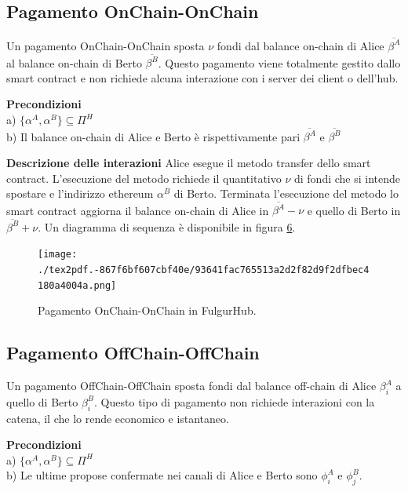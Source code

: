 \documentclass[12pt,italian,]{book}
\begin{document}
\hypertarget{pagamento-onchain-onchain}{%
\subsection{Pagamento OnChain-OnChain}\label{pagamento-onchain-onchain}}

Un pagamento OnChain-OnChain sposta \(\nu\) fondi dal balance on-chain di Alice \(\overline{\beta^A}\) al balance on-chain di Berto \(\overline{\beta^B}\). Questo pagamento viene totalmente gestito dallo smart contract e non richiede alcuna interazione con i server dei client o dell'hub.

\textbf{\textbf{Precondizioni}}\\
a) \(\{\alpha^A, \alpha^B\} \subseteq \Pi^H\)\\
b) Il balance on-chain di Alice e Berto è rispettivamente pari \(\overline{\beta^A}\) e \(\overline{\beta^B}\)

\textbf{\textbf{Descrizione delle interazioni}} Alice esegue il metodo transfer dello smart contract. L'esecuzione del metodo richiede il quantitativo \(\nu\) di fondi che si intende spostare e l'indirizzo ethereum \(\alpha^B\) di Berto. Terminata l'esecuzione del metodo lo smart contract aggiorna il balance on-chain di Alice in \(\overline{\beta^A}-\nu\) e quello di Berto in \(\overline{\beta^B}+\nu\). Un diagramma di sequenza è disponibile in figura \protect\hyperlink{caso-duso-onchain-onchain}{6}.

\begin{figure}
\centering
\texttt{[image: ./tex2pdf.-867f6bf607cbf40e/93641fac765513a2d2f82d9f2dfbec4180a4004a.png]}
\caption{\protect\hypertarget{caso-duso-onchain-onchain}{}{}Pagamento OnChain-OnChain in FulgurHub.}
\end{figure}

\hypertarget{pagamento-offchain-offchain}{%
\subsection{Pagamento OffChain-OffChain}\label{pagamento-offchain-offchain}}

Un pagamento OffChain-OffChain sposta fondi dal balance off-chain di Alice \(\beta^A_i\) a quello di Berto \(\beta^B_i\). Questo tipo di pagamento non richiede interazioni con la catena, il che lo rende economico e istantaneo.

\textbf{\textbf{Precondizioni}}\\
a) \(\{\alpha^A, \alpha^B\} \subseteq \Pi^H\)\\
b) Le ultime propose confermate nei canali di Alice e Berto sono \(\phi^A_i\) e \(\phi^B_j\).
\end{document}
